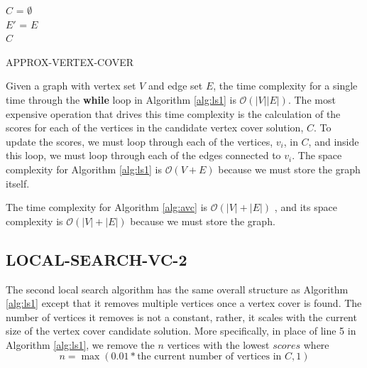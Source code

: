 \documentclass[sigconf]{acmart}
\newcommand{\bigo}[1]{\mathcal{O}(#1)}
\begin{document}
\begin{algorithm}[h]
	\SetAlgoNoLine
	$C$ = $\emptyset$\\
	$E'$ = $E$\\
	\Return $C$
	
	\caption{APPROX-VERTEX-COVER}
	\label{alg:avc}
\end{algorithm}

Given a graph with vertex set $V$ and edge set $E$, the time complexity for a single time through the \textbf{while} loop in Algorithm \ref{alg:ls1} is $\bigo{|V||E|}$. The most expensive operation that drives this time complexity is the calculation of the scores for each of the vertices in the candidate vertex cover solution, $C$. To update the scores, we must loop through each of the vertices, $v_i$, in $C$, and inside this loop, we must loop through each of the edges connected to $v_i$. The space complexity for Algorithm \ref{alg:ls1} is $\bigo{V + E}$ because we must store the graph itself.

The time complexity for Algorithm \ref{alg:avc} is $\bigo{|V| + |E|}$ \cite{intro_alg_2009}, and its space complexity is $\bigo{|V| + |E|}$ because we must store the graph.  

\subsection{LOCAL-SEARCH-VC-2}
The second local search algorithm has the same overall structure as Algorithm \ref{alg:ls1} except that it removes multiple vertices once a vertex cover is found. The number of vertices it removes is not a constant, rather, it scales with the current size of the vertex cover candidate solution. More specifically, in place of line 5 in Algorithm \ref{alg:ls1}, we remove the $n$ vertices with the lowest $scores$ where
\begin{equation*}
	n = \max(0.01 * \textrm{the current number of vertices in $C$}, 1)
\end{equation*}
\end{document}
